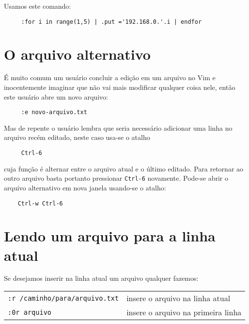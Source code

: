 Usamos este comando:

\begin{verbatim}
     :for i in range(1,5) | .put ='192.168.0.'.i | endfor
\end{verbatim}

\section{O arquivo alternativo}
\label{O arquivo alternativo}

É muito comum um usuário concluir a edição em um arquivo no Vim e
inocentemente imaginar que não vai mais modificar qualquer coisa nele, então
este usuário abre um novo arquivo:

\begin{verbatim}
     :e novo-arquivo.txt
\end{verbatim}

Mas de repente o usuário lembra que seria necessário adicionar uma linha no
arquivo recém editado, neste caso usa-se o atalho

\begin{verbatim}
     Ctrl-6
\end{verbatim}

cuja função é alternar entre o arquivo atual e o último editado. Para retornar
ao outro arquivo basta portanto pressionar \verb|Ctrl-6| novamente. Pode-se 
abrir o arquivo alternativo em nova janela usando-se o atalho:

\begin{verbatim}
    Ctrl-w Ctrl-6
\end{verbatim}

\section{Lendo um arquivo para a linha atual}
\label{sec:Lendo um arquivo para a linha atual}

Se desejamos inserir na linha atual um arquivo qualquer fazemos:

\begin{table}[htb]\begin{center} \begin{tabular}{ll} \hline
	 \verb|:r /caminho/para/arquivo.txt| & insere o arquivo na linha atual\\
	 \verb|:0r arquivo| & insere o arquivo na primeira linha\\
\hline \end{tabular}\end{center}\end{table}

